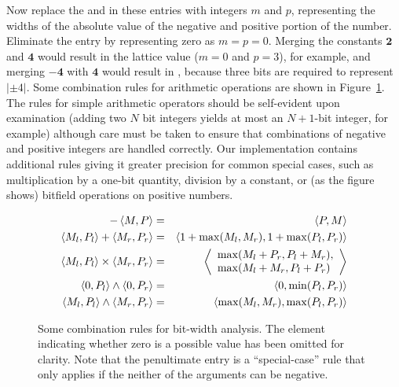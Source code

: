 \documentclass[oribibl]{llncs}
\begin{document}
Now replace the  and  in these entries with integers
$m$ and $p$, representing the
widths of the absolute value of the negative and positive portion of
the number.  Eliminate the  entry by representing zero as
$m=p=0$.
Merging the constants $\mathbf{2}$ and $\mathbf{4}$ would
result in the lattice
value  ($m=0$ and $p=3$),
for example, and merging $\mathbf{-4}$ with $\mathbf{4}$ would result
in , because three bits are required to represent
$\left|\pm 4\right|$.
Some combination rules for arithmetic operations are
shown in Figure~\ref{fig:bitrules}.  The rules for simple arithmetic
operators should be self-evident upon examination (adding two $N$ bit
integers yields at most an $N+1$-bit integer, for example) although
care must be taken to ensure that combinations of negative and
positive integers are handled correctly.  Our implementation contains
additional rules giving it greater precision for common special cases,
such as multiplication by
a one-bit quantity, division by a constant, or (as the figure shows)
bitfield operations on positive numbers.
\begin{figure}%
\begin{eqnarray*}
-\left\langle M,P \right\rangle &=& \left\langle P,M \right\rangle\\
\left\langle M_l,P_l \right\rangle + \left\langle M_r,P_r \right\rangle &=& \left\langle 1+\max(M_l,M_r),1+\max(P_l,P_r) \right\rangle\\
\left\langle M_l,P_l \right\rangle \times \left\langle M_r,P_r \right\rangle &=&
\left\langle \begin{array}{l}\max(M_l+P_r,P_l+M_r),\\
                       \max(M_l+M_r,P_l+P_r)\end{array} \right\rangle\\
\left\langle 0,P_l \right\rangle \wedge \left\langle 0,P_r \right\rangle &=& \left\langle 0,\min(P_l,P_r) \right\rangle\\
\left\langle M_l,P_l \right\rangle\wedge \left\langle M_r,P_r \right\rangle &=& \left\langle \max(M_l,M_r),\max(P_l,P_r) \right\rangle
\end{eqnarray*}%
\caption{Some combination rules for bit-width analysis.  The 
  element indicating whether zero is a possible value has been omitted
  for clarity.  Note that the penultimate entry is a
  ``special-case'' rule that only applies if the neither of the
  arguments can be negative.}\label{fig:bitrules}
\end{figure}
\end{document}
